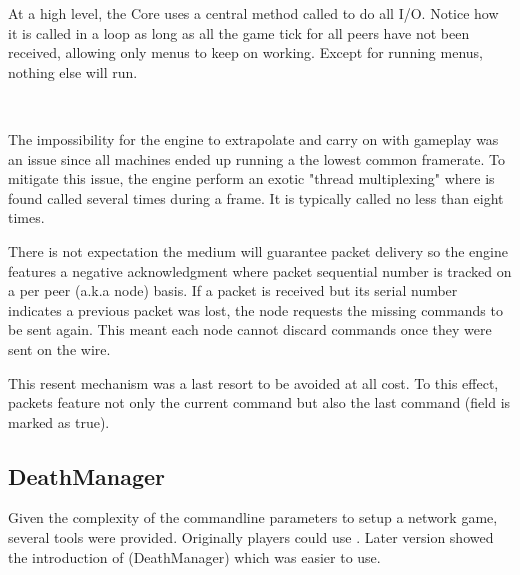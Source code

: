At a high level, the Core uses a central method called  to do all I/O. Notice how it is called in a loop as long as all the game tick for all peers have not been received, allowing only menus to keep on working. Except for running menus, nothing else will run.\\
\par
{}\\
\par
The impossibility for the engine to extrapolate and carry on with gameplay was an issue since all machines ended up running a the lowest common framerate. To mitigate this issue, the engine perform an exotic "thread multiplexing" where  is found called several times during a frame. It is typically called no less than eight times.\\
\par
{}



There is not expectation the medium will guarantee packet delivery so the engine features a negative acknowledgment where packet sequential number is tracked on a per peer (a.k.a node) basis. If a packet is received but its serial number indicates a previous packet was lost, the node requests the missing commands to be sent again. This meant each node cannot discard commands once they were sent on the wire.\\
\par
This resent mechanism was a last resort to be avoided at all cost. To this effect, packets feature not only the current command but also the last command (field  is marked as true).\\





\subsection{DeathManager}
Given the complexity of the commandline parameters to setup a network game, several tools were provided. Originally players could use . Later version showed the introduction of (DeathManager) which was easier to use.\\
\par
{}
\\
\par











